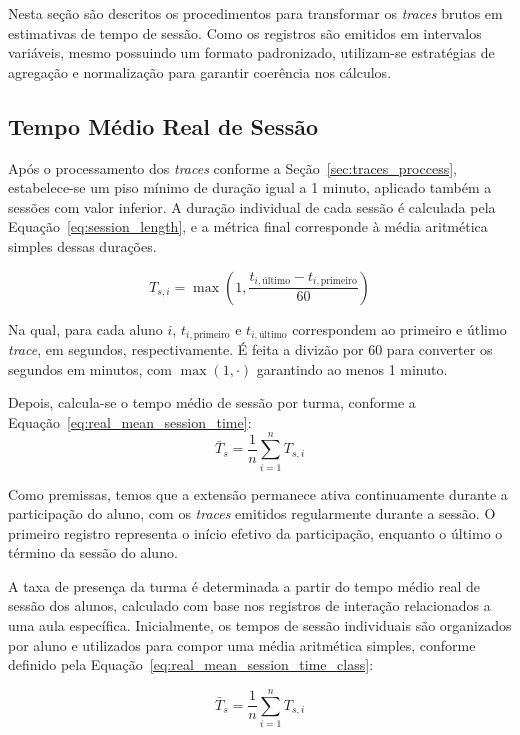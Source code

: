 Nesta seção são descritos os procedimentos para transformar os \textit{traces} brutos em estimativas de tempo de sessão. Como os registros são emitidos em intervalos variáveis, mesmo possuindo um formato padronizado, utilizam-se estratégias de agregação e normalização para garantir coerência nos cálculos.

\subsection{Tempo Médio Real de Sessão}
Após o processamento dos \textit{traces} conforme a Seção~\ref{sec:traces_proccess}, estabelece-se um piso mínimo de duração igual a 1 minuto, aplicado também a sessões com valor inferior. A duração individual de cada sessão é calculada pela Equação~\ref{eq:session_length}, e a métrica final corresponde à média aritmética simples dessas durações.


\begin{equation}\label{eq:session_length}
T_{s,i} = \max\left(1, \frac{t_{i,\text{último}} - t_{i,\text{primeiro}}}{60}\right)
\end{equation}

Na qual, para cada aluno $i$, $t_{i,\text{primeiro}}$ e $t_{i,\text{último}}$ correspondem ao primeiro e útlimo \textit{trace}, em segundos, respectivamente. É feita a divizão por 60 para converter os segundos em minutos, com $\max(1, \cdot)$ garantindo ao menos 1 minuto.


Depois, calcula-se o  tempo médio de sessão por turma, conforme a Equação~\ref{eq:real_mean_session_time}:
\begin{equation}\label{eq:real_mean_session_time}
\bar{T}_s = \frac{1}{n} \sum_{i=1}^{n} T_{s,i}
\end{equation}

Como premissas, temos que a extensão permanece ativa continuamente durante a participação do aluno, com os \textit{traces} emitidos regularmente durante a sessão. O primeiro registro representa o início efetivo da participação, enquanto o último o término da sessão do aluno.


A taxa de presença da turma é determinada a partir do tempo médio real de sessão dos alunos, calculado com base nos registros de interação relacionados a uma aula específica. Inicialmente, os tempos de sessão individuais são organizados por aluno e utilizados para compor uma média aritmética simples, conforme definido pela Equação~\ref{eq:real_mean_session_time_class}:

\begin{equation}\label{eq:real_mean_session_time_class}
\bar{T}_s = \frac{1}{n} \sum_{i=1}^{n} T_{s,i}
\end{equation}

